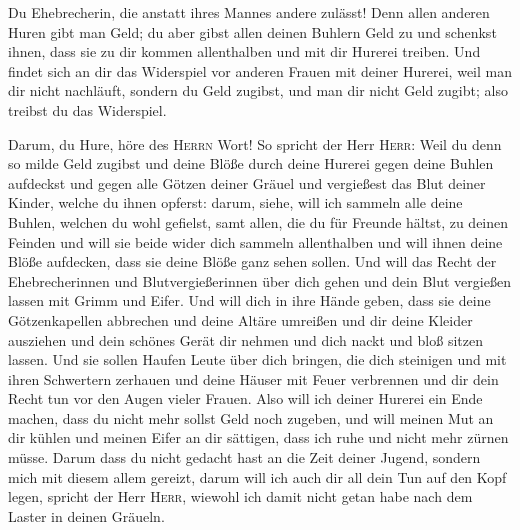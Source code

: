  Du Ehebrecherin, die anstatt ihres Mannes andere
zulässt!  Denn allen anderen Huren gibt man Geld; du aber
gibst allen deinen Buhlern Geld zu und schenkst ihnen, dass sie zu dir
kommen allenthalben und mit dir Hurerei treiben.  Und
findet sich an dir das Widerspiel vor anderen Frauen mit deiner Hurerei,
weil man dir nicht nachläuft, sondern du Geld zugibst, und man dir nicht
Geld zugibt; also treibst du das Widerspiel.

 Darum, du Hure, höre des \textsc{Herrn} Wort!
 So spricht der Herr \textsc{Herr}: Weil du denn so milde
Geld zugibst und deine Blöße durch deine Hurerei gegen deine Buhlen
aufdeckst und gegen alle Götzen deiner Gräuel und vergießest das Blut
deiner Kinder, welche du ihnen opferst:  darum, siehe,
will ich sammeln alle deine Buhlen, welchen du wohl gefielst, samt
allen, die du für Freunde hältst, zu deinen Feinden und will sie beide
wider dich sammeln allenthalben und will ihnen deine Blöße aufdecken,
dass sie deine Blöße ganz sehen sollen.  Und will das
Recht der Ehebrecherinnen und Blutvergießerinnen über dich gehen und
dein Blut vergießen lassen mit Grimm und Eifer.  Und will
dich in ihre Hände geben, dass sie deine Götzenkapellen abbrechen und
deine Altäre umreißen und dir deine Kleider ausziehen und dein schönes
Gerät dir nehmen und dich nackt und bloß sitzen lassen. 
Und sie sollen Haufen Leute über dich bringen, die dich steinigen und
mit ihren Schwertern zerhauen  und deine Häuser mit Feuer
verbrennen und dir dein Recht tun vor den Augen vieler Frauen. Also will
ich deiner Hurerei ein Ende machen, dass du nicht mehr sollst Geld noch
zugeben,  und will meinen Mut an dir kühlen und meinen
Eifer an dir sättigen, dass ich ruhe und nicht mehr zürnen müsse.
 Darum dass du nicht gedacht hast an die Zeit deiner
Jugend, sondern mich mit diesem allem gereizt, darum will ich auch dir
all dein Tun auf den Kopf legen, spricht der Herr \textsc{Herr}, wiewohl
ich damit nicht getan habe nach dem Laster in deinen Gräueln.


